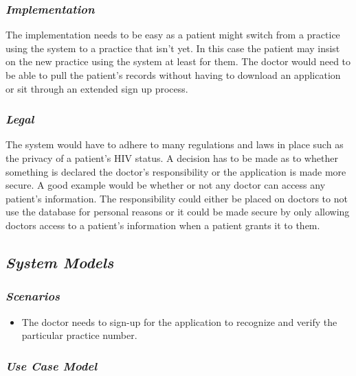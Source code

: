 \documentclass[a4paper]{article}
\begin{document}
	\subsubsection{\textit{Implementation}}
	The implementation needs to be easy as a patient might switch from a practice using the system to a practice that isn't yet. In this case the patient may insist on the new practice using the system at least for them. The doctor would need to be able to pull the patient's records without having to download an application or sit through an extended sign up process.
	
	\subsubsection{\textit{Legal}}
	The system would have to adhere to many regulations and laws in place such as the privacy of a patient's HIV status. A decision has to be made as to whether something is declared the doctor's responsibility or the application is made more secure. A good example would be whether or not any doctor can access any patient's information. The responsibility could either be placed on doctors to not use the database for personal reasons or it could be made secure by only allowing doctors access to a patient's information when a patient grants it to them.

\subsection{\textit{System Models}}

\subsubsection{\textit{Scenarios}}

\begin{itemize}
\item The doctor needs to sign-up for the application to recognize and verify the particular practice number.
\end{itemize}


\subsubsection{\textit{Use Case Model}}

\FloatBarrier
\end{document}
